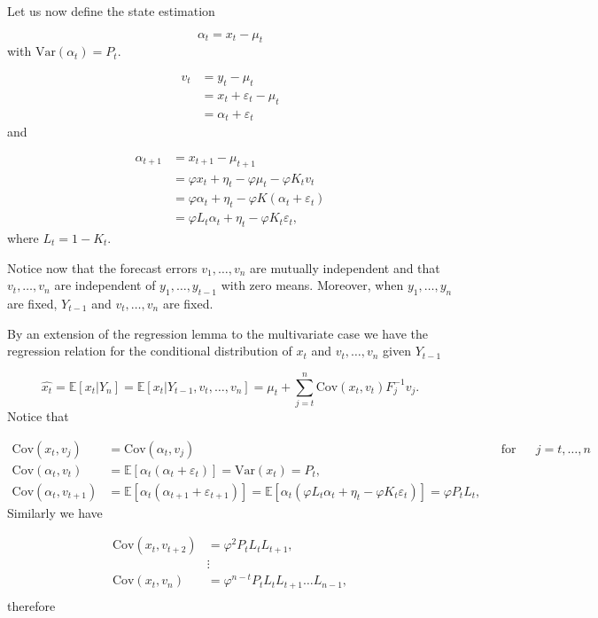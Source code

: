 \documentclass[11pt,a4paper]{article}
\newcommand{\E}{\mathbb{E}}
\newcommand{\var}{\mathrm{Var}}
\newcommand{\cov}{\mathrm{Cov}}
\begin{document}
Let us now define the state estimation

\[
    \alpha_t = x_t - \mu_t
\]
with $\var(\alpha_t) = P_t$.

\begin{align*}
    v_t &= y_t - \mu_t\\
    &= x_t + \varepsilon_t - \mu_t\\
    &= \alpha_t + \varepsilon_t
\end{align*}
and

\begin{align*}
    \alpha_{t+1} &= x_{t+1} - \mu_{t+1}\\
    &= \varphi x_t + \eta_t - \varphi \mu_t - \varphi K_t v_t\\
    &= \varphi \alpha_t + \eta_t - \varphi K(\alpha_t + \varepsilon_t)\\
    &= \varphi L_t\alpha_t + \eta_t - \varphi K_t\varepsilon_t,
\end{align*}
where    $L_t = 1 - K_t$.

Notice now that the forecast errors $v_1, \dots, v_n$ are mutually independent and that $v_t, \dots, v_n$ are independent of $y_1, \dots, y_{t-1}$ with zero means. Moreover, when $y_1, \dots, y_n$ are fixed, $Y_{t-1}$ and $v_t, \dots, v_n$ are fixed.

By an extension of the regression lemma to the multivariate case we have the regression relation for the conditional distribution of $x_t$ and $v_t, \dots, v_n$ given $Y_{t-1}$

\[
    \hat{x_t} = \E[x_t | Y_n] = \E[x_t | Y_{t-1}, v_t, \dots, v_n] = \mu_t + \sum^n_{j=t} \cov(x_t, v_t)F^{-1}_j v_j.
\]
Notice that

\begin{align*}
    \cov(x_t, v_j) &= \cov(\alpha_t, v_j) && \textrm{for} && j = t, \dots, n\\
    \cov(\alpha_t, v_t) &= \E[\alpha_t(\alpha_t + \varepsilon_t)] = \var(x_t) = P_t,\\
    \cov(\alpha_t, v_{t+1}) &= \E[\alpha_t(\alpha_{t+1} + \varepsilon_{t+1})] = \E[\alpha_t(\varphi L_t\alpha_t + \eta_t - \varphi K_t\varepsilon_t)] = \varphi P_t L_t,
\end{align*}
Similarly we have

\begin{align*}
   \cov(x_t, v_{t+2}) &= \varphi^2 P_t L_t L_{t+1},\\
   &\vdots\\
   \cov(x_t, v_n) &= \varphi^{n-t} P_t L_t L_{t+1} \dots L_{n-1},\\
\end{align*}
therefore
\end{document}
